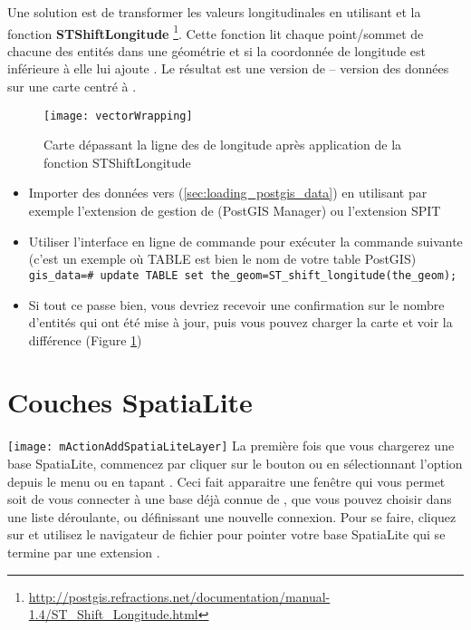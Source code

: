 Une solution est de transformer les valeurs longitudinales en utilisant \pg 
et la fonction \textbf{ST\textunderscore Shift\textunderscore Longitude}
\footnote{\url{http://postgis.refractions.net/documentation/manual-1.4/ST_Shift_Longitude.html}}. 
Cette fonction lit chaque point/sommet de chacune des entités dans une 
géométrie et si la coordonnée de longitude est inférieure à  
elle lui ajoute . Le résultat est une version de  
--  version des données sur une carte centré à .

\begin{figure}[ht]
   \begin{center}
   \texttt{[image: vectorWrapping]}
   \caption{Carte dépassant la ligne des  de longitude après 
	application de la fonction ST\textunderscore Shift\textunderscore Longitude}
\label{fig:vector_wrapping}
\end{center}
\end{figure}


\begin{itemize}[label=--]
\item Importer des données vers \pg (\ref{sec:loading_postgis_data}) en 
utilisant par exemple l'extension de gestion de \pg (PostGIS Manager) ou 
l'extension SPIT
\item Utiliser l'interface en ligne de commande \pg pour exécuter la 
commande suivante (c'est un exemple où TABLE est bien le nom de votre 
table PostGIS) \\ 
\texttt{gis\_data=\# update TABLE set the\_geom=ST\_shift\_longitude(the\_geom);} 
\item Si tout ce passe bien, vous devriez recevoir une confirmation sur 
le nombre d'entités qui ont été mise à jour, puis vous pouvez charger 
la carte et voir la différence (Figure \ref{fig:vector_wrapping})
\end{itemize}

\section{Couches SpatiaLite} 
\label{label_spatialite} 

\texttt{[image: mActionAddSpatiaLiteLayer]}
La première fois que vous chargerez une base SpatiaLite, commencez par 
cliquer sur le bouton  ou en sélectionnant l'option\\  depuis le menu  ou en 
tapant . Ceci fait apparaitre une fenêtre qui vous permet 
soit de vous connecter à une base déjà connue de \qg, que vous pouvez 
choisir dans une liste déroulante, ou définissant une nouvelle connexion. 
Pour se faire, cliquez sur  et utilisez le navigateur 
de fichier pour pointer votre base SpatiaLite qui se termine par une 
extension .

